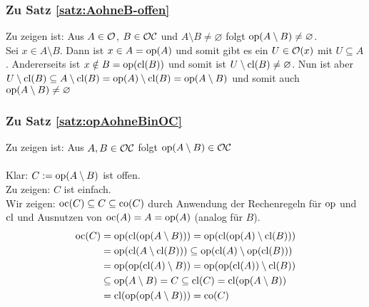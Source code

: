 \subsubsection{Zu Satz \ref{satz:AohneB-offen}}\label{anh:AohneB-offen}
    Zu zeigen ist: Aus $A \in \mathcal{O}$, $B \in \mathcal{OC}$ und $A \setminus B \neq \varnothing$ folgt $\text{op}(A \setminus B) \neq \varnothing$.\\
    Sei $x \in A \setminus B$. Dann ist $x \in A = \text{op}(A)$ und somit gibt es ein ${U \in \mathcal{O}(x)}$ mit ${U \subseteq A}$. 
    Andererseits ist $x \notin B = \text{op}(\text{cl}(B))$ und somit ist $U \setminus \text{cl}(B) \neq \varnothing$. 
    Nun ist aber $U \setminus \text{cl}(B) \subseteq A \setminus \text{cl}(B) = \text{op}(A) \setminus \text{cl}(B) = \text{op}(A \setminus B)$ und somit auch $\text{op}(A \setminus B) \neq \varnothing$

    
\subsubsection{Zu Satz \ref{satz:opAohneBinOC}}\label{anh:opAohneBinOC}
    Zu zeigen ist: Aus $A,B \in \mathcal{OC}$ folgt $\text{op}(A \setminus B) \in \mathcal{OC}$\\ \ \\
    Klar: $C := \text{op}(A \setminus B)$ ist offen.\\
    Zu zeigen: $C$ ist einfach.\\
    Wir zeigen: $\text{oc}(C) \subseteq C \subseteq \text{co}(C)$ durch Anwendung der Rechenregeln für $\text{op}$ und $\text{cl}$ und Ausnutzen von $\text{oc}(A) = A = \text{op}(A)$ (analog für $B$).
    \begin{align*}
        \text{oc}(C) 
        &= \text{op}(\text{cl}(\text{op}(A \setminus B))) 
        = \text{op}(\text{cl}(\text{op}(A) \setminus \text{cl}(B))) 
        \\
        &= \text{op}(\text{cl}(A \setminus \text{cl}(B)))
        \subseteq \text{op}(\text{cl}(A) \setminus \text{op}(\text{cl}(B)))
        \\
        &= \text{op}(\text{op}(\text{cl}(A) \setminus B))
        = \text{op}(\text{op}(\text{cl}(A)) \setminus \text{cl}(B))
        \\
        &\subseteq \text{op}(A \setminus B)
        = C
        \subseteq \text{cl}(C)
        = \text{cl}(\text{op}(A \setminus B))
        \\
        &= \text{cl}(\text{op}(\text{op}(A \setminus B)))
        = \text{co}(C)
    \end{align*}

    
    


